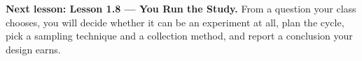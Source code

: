 \documentclass[12pt]{article}
\begin{document}
\boxguard[3]   %
\begin{spiralbox}
\textbf{Next lesson: Lesson 1.8 --- You Run the Study.} From a question your class chooses,
you will decide whether it can be an experiment at all, plan the cycle, pick a sampling
technique and a collection method, and report a conclusion your design earns.
\end{spiralbox}
\end{document}
